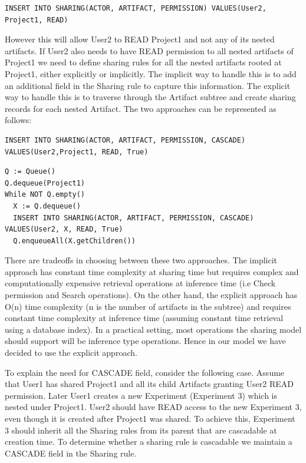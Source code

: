 \documentclass[sigconf]{acmart}
\begin{document}
\begin{lstlisting} 
INSERT INTO SHARING(ACTOR, ARTIFACT, PERMISSION) VALUES(User2, Project1, READ)
\end{lstlisting}

However this will allow User2 to READ Project1 and not any of its nested artifacts. If User2 also needs to have READ permission to all nested artifacts of Project1 we need to define sharing rules for all the nested artifacts rooted at Project1, either explicitly or implicitly. The implicit way to handle this is to add an additional field in the Sharing rule to capture this information. The explicit way to handle this is to traverse through the Artifact subtree and create sharing records for each nested Artifact. The two approaches can be represented as follows:

\begin{lstlisting} 
INSERT INTO SHARING(ACTOR, ARTIFACT, PERMISSION, CASCADE) VALUES(User2,Project1, READ, True)
\end{lstlisting}

\begin{lstlisting} 
Q := Queue()
Q.dequeue(Project1)
While NOT Q.empty()
  X := Q.dequeue()
  INSERT INTO SHARING(ACTOR, ARTIFACT, PERMISSION, CASCADE) VALUES(User2, X, READ, True)
  Q.enqueueAll(X.getChildren())
\end{lstlisting}

There are tradeoffs in choosing between these two approaches. The implicit approach has constant time complexity at sharing time but requires complex and computationally expensive retrieval operations at inference time (i.e Check permission and Search operations). On the other hand, the explicit approach has O(n) time complexity (n is the number of artifacts in the subtree) and requires constant time complexity at inference time (assuming constant time retrieval using a database index). In a practical setting, most operations the sharing model should support will be inference type operations. Hence in our model we have decided to use the explicit approach.

To explain the need for CASCADE field, consider the following case. Assume that User1 has shared Project1 and all its child Artifacts granting User2 READ permission. Later User1 creates a new Experiment (Experiment 3) which is nested under Project1. User2 should have READ access to the new Experiment 3, even though it is created after Project1 was shared. To achieve this, Experiment 3 should inherit all the Sharing rules from its parent that  are cascadable at creation time. To determine whether a sharing rule is cascadable we maintain a CASCADE field in the Sharing rule.
\end{document}
